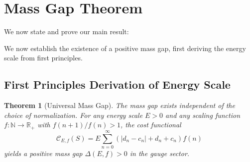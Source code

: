 \documentclass[11pt]{article}
\numberwithin{equation}{section}
\newtheorem{theorem}{Theorem}[section]
\theoremstyle{definition}
\theoremstyle{remark}
\begin{document}
\section{Mass Gap Theorem}

We now state and prove our main result:

We now establish the existence of a positive mass gap, first deriving the energy scale from first principles.

\subsection{First Principles Derivation of Energy Scale}

\begin{theorem}[Universal Mass Gap]
The mass gap exists independent of the choice of normalization. For any energy scale $E > 0$ and any scaling function $f: \mathbb{N} \to \mathbb{R}_+$ with $f(n+1)/f(n) > 1$, the cost functional
\begin{equation}
\mathcal{C}_{E,f}(S) = E \sum_{n=0}^{\infty} \left(|d_n - c_n| + d_n + c_n\right) f(n)
\end{equation}
yields a positive mass gap $\Delta(E,f) > 0$ in the gauge sector.
\end{theorem}
\end{document}
